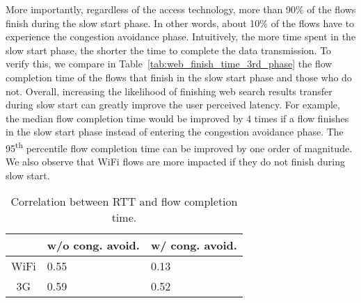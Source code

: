 More importantly, regardless of the access technology, more than 90\% of the flows finish during the slow start phase. In other words, about 10\% of the flows have to experience the congestion avoidance phase. Intuitively, the more time spent in the slow start phase, the shorter the time to complete the data transmission. To verify this, we compare in Table~\ref{tab:web_finish_time_3rd_phase} the flow completion time of the flows that finish in the slow start phase and those who do not. Overall, increasing the likelihood of finishing web search results transfer during slow start can greatly improve the user perceived latency. For example, the median flow completion time would be improved by 4 times if a flow finishes in the slow start phase instead of entering the congestion avoidance phase. The 95\textsuperscript{th} percentile flow completion time can be improved by one order of magnitude. We also observe that WiFi flows are more impacted if they do not finish during slow start.


\begin{table}[th]
\caption{Correlation between RTT and flow completion time.}
\label{tab:web_rtt_finish_time_correlation}
\centering
\renewcommand{\arraystretch}{1.0}
\begin{tabular}{c|C{2.5cm}|C{2.5cm}}
   \hline
   & w/o cong. avoid. & w/ cong. avoid. \\
   \hline
   WiFi & 0.55 & 0.13 \\
   3G & 0.59 & 0.52 \\
   \hline
\end{tabular}
\end{table}

